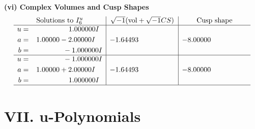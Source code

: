 \documentclass[1p]{elsarticle_modified}
\theoremstyle{definition}
\newcommand{\I}{\sqrt{-1}}
\begin{document}
\newpage\flushleft \textbf{(vi) Complex Volumes and Cusp Shapes}
$$\begin{array}{c|c|c}  
\text{Solutions to }I^u_{6}& \I (\text{vol} + \sqrt{-1}CS) & \text{Cusp shape}\\
 \hline 
\begin{aligned}
u &= \phantom{-0.000000 -}1.000000 I \\
a &= \phantom{-}1.00000 - 2.00000 I \\
b &= \phantom{-0.000000 } -1.000000 I\end{aligned}
 & -1.64493\phantom{ +0.000000I} & -8.00000\phantom{ +0.000000I} \\ \hline\begin{aligned}
u &= \phantom{-0.000000 } -1.000000 I \\
a &= \phantom{-}1.00000 + 2.00000 I \\
b &= \phantom{-0.000000 -}1.000000 I\end{aligned}
 & -1.64493\phantom{ +0.000000I} & -8.00000\phantom{ +0.000000I}\\
 \hline 
 \end{array}$$\newpage
\newpage\renewcommand{\arraystretch}{1}
\centering \section*{ VII. u-Polynomials}
\end{document}
